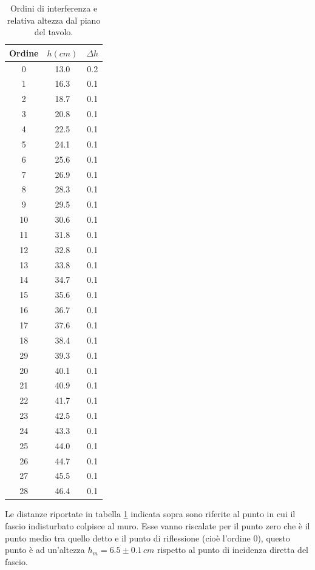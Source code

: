 \documentclass[10pt,a4paper]{article}
\begin{document}
\begin{table}[!htb]
\centering
\begin{tabular}{|c|c|c|}
\hline
Ordine & $h (cm)$ & $ \Delta h$ \\
\hline
0	&	13.0	&	0.2\\
1	&	16.3	&	0.1\\
2	&	18.7	&	0.1\\
3	&	20.8	&	0.1\\
4	&	22.5	&	0.1\\
5	&	24.1	&	0.1\\
6	&	25.6	&	0.1\\
7	&	26.9	&	0.1\\
8	&	28.3	&	0.1\\
9	&	29.5	&	0.1\\
10	&	30.6	&	0.1\\
11	&	31.8	&	0.1\\
12	&	32.8	&	0.1\\
13	&	33.8	&	0.1\\
14	&	34.7	&	0.1\\
15	&	35.6	&	0.1\\
16	&	36.7	&	0.1\\
17	&	37.6	&	0.1\\
18	&	38.4	&	0.1\\
29	&	39.3	&	0.1\\
20	&	40.1	&	0.1\\
21	&	40.9	&	0.1\\
22	&	41.7	&	0.1\\
23	&	42.5	&	0.1\\
24	&	43.3	&	0.1\\
25	&	44.0	&	0.1\\
26	&	44.7	&	0.1\\
27	&	45.5	&	0.1\\
28	&	46.4	&	0.1\\
\hline
\end{tabular}
\caption{Ordini di interferenza e relativa altezza dal piano del tavolo.}
\label{Ordini}
\end{table}

Le distanze riportate in tabella \ref{Ordini} indicata sopra sono riferite al punto in cui il fascio indisturbato colpisce al muro. Esse vanno riscalate per il punto zero che è il punto medio tra quello detto e il punto di riflessione (cioè l'ordine 0), questo punto è ad un'altezza $h_m = 6.5 \pm 0.1 \, cm$ rispetto al punto di incidenza diretta del fascio.\\
\end{document}
